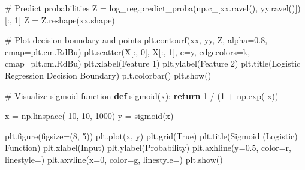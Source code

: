 \documentclass[
  letterpaper,
  DIV=11,
  numbers=noendperiod]{scrreprt}
\newenvironment{Shaded}{\begin{snugshade}}{\end{snugshade}}
\newcommand{\CommentTok}[1]{\textcolor[rgb]{0.37,0.37,0.37}{#1}}
\newcommand{\ControlFlowTok}[1]{\textcolor[rgb]{0.00,0.23,0.31}{\textbf{#1}}}
\newcommand{\DecValTok}[1]{\textcolor[rgb]{0.68,0.00,0.00}{#1}}
\newcommand{\FloatTok}[1]{\textcolor[rgb]{0.68,0.00,0.00}{#1}}
\newcommand{\KeywordTok}[1]{\textcolor[rgb]{0.00,0.23,0.31}{\textbf{#1}}}
\newcommand{\NormalTok}[1]{\textcolor[rgb]{0.00,0.23,0.31}{#1}}
\newcommand{\OperatorTok}[1]{\textcolor[rgb]{0.37,0.37,0.37}{#1}}
\newcommand{\StringTok}[1]{\textcolor[rgb]{0.13,0.47,0.30}{#1}}
\newcommand{\VariableTok}[1]{\textcolor[rgb]{0.07,0.07,0.07}{#1}}
\begin{document}
\begin{Shaded}
\begin{Highlighting}[]
\CommentTok{\# Predict probabilities}
\NormalTok{Z }\OperatorTok{=}\NormalTok{ log\_reg.predict\_proba(np.c\_[xx.ravel(), yy.ravel()])[:, }\DecValTok{1}\NormalTok{]}
\NormalTok{Z }\OperatorTok{=}\NormalTok{ Z.reshape(xx.shape)}

\CommentTok{\# Plot decision boundary and points}
\NormalTok{plt.contourf(xx, yy, Z, alpha}\OperatorTok{=}\FloatTok{0.8}\NormalTok{, cmap}\OperatorTok{=}\NormalTok{plt.cm.RdBu)}
\NormalTok{plt.scatter(X[:, }\DecValTok{0}\NormalTok{], X[:, }\DecValTok{1}\NormalTok{], c}\OperatorTok{=}\NormalTok{y, edgecolors}\OperatorTok{=}\StringTok{\textquotesingle{}k\textquotesingle{}}\NormalTok{, cmap}\OperatorTok{=}\NormalTok{plt.cm.RdBu)}
\NormalTok{plt.xlabel(}\StringTok{\textquotesingle{}Feature 1\textquotesingle{}}\NormalTok{)}
\NormalTok{plt.ylabel(}\StringTok{\textquotesingle{}Feature 2\textquotesingle{}}\NormalTok{)}
\NormalTok{plt.title(}\StringTok{\textquotesingle{}Logistic Regression Decision Boundary\textquotesingle{}}\NormalTok{)}
\NormalTok{plt.colorbar()}
\NormalTok{plt.show()}

\CommentTok{\# Visualize sigmoid function}
\KeywordTok{def}\NormalTok{ sigmoid(x):}
    \ControlFlowTok{return} \DecValTok{1} \OperatorTok{/}\NormalTok{ (}\DecValTok{1} \OperatorTok{+}\NormalTok{ np.exp(}\OperatorTok{{-}}\NormalTok{x))}

\NormalTok{x }\OperatorTok{=}\NormalTok{ np.linspace(}\OperatorTok{{-}}\DecValTok{10}\NormalTok{, }\DecValTok{10}\NormalTok{, }\DecValTok{1000}\NormalTok{)}
\NormalTok{y }\OperatorTok{=}\NormalTok{ sigmoid(x)}

\NormalTok{plt.figure(figsize}\OperatorTok{=}\NormalTok{(}\DecValTok{8}\NormalTok{, }\DecValTok{5}\NormalTok{))}
\NormalTok{plt.plot(x, y)}
\NormalTok{plt.grid(}\VariableTok{True}\NormalTok{)}
\NormalTok{plt.title(}\StringTok{\textquotesingle{}Sigmoid (Logistic) Function\textquotesingle{}}\NormalTok{)}
\NormalTok{plt.xlabel(}\StringTok{\textquotesingle{}Input\textquotesingle{}}\NormalTok{)}
\NormalTok{plt.ylabel(}\StringTok{\textquotesingle{}Probability\textquotesingle{}}\NormalTok{)}
\NormalTok{plt.axhline(y}\OperatorTok{=}\FloatTok{0.5}\NormalTok{, color}\OperatorTok{=}\StringTok{\textquotesingle{}r\textquotesingle{}}\NormalTok{, linestyle}\OperatorTok{=}\StringTok{\textquotesingle{}{-}{-}\textquotesingle{}}\NormalTok{)}
\NormalTok{plt.axvline(x}\OperatorTok{=}\DecValTok{0}\NormalTok{, color}\OperatorTok{=}\StringTok{\textquotesingle{}g\textquotesingle{}}\NormalTok{, linestyle}\OperatorTok{=}\StringTok{\textquotesingle{}{-}{-}\textquotesingle{}}\NormalTok{)}
\NormalTok{plt.show()}
\end{Highlighting}
\end{Shaded}
\end{document}
